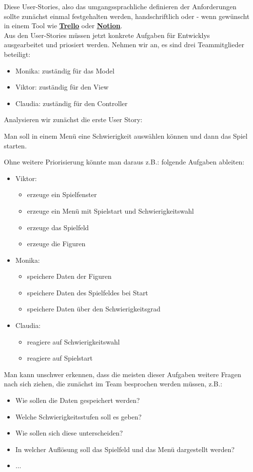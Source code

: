 \documentclass{article}
\begin{document}
Diese User-Stories, also das umgangssprachliche definieren der Anforderungen sollte zunächst einmal festgehalten werden, handschriftlich oder - wenn gewünscht in einem Tool wie \textbf{\href{https://trello.com/}{Trello}} oder \textbf{\href{https://www.notion.so/de-de}{Notion}}. \\
Aus den User-Stories müssen jetzt konkrete Aufgaben für Entwicklys ausgearbeitet und priosiert werden. Nehmen wir an, es sind drei Teammitglieder beteiligt:
\begin{itemize}
    \item Monika: zuständig für das Model
    \item Viktor: zuständig für den View
    \item Claudia: zuständig für den Controller 
\end{itemize}

Analysieren wir zunächst die erste User Story:
\begin{center}
    Man soll in einem Menü eine Schwierigkeit auswählen können und dann das Spiel starten.
\end{center}
Ohne weitere Priorisierung könnte man daraus z.B.: folgende Aufgaben ableiten:
\begin{itemize}
    \item Viktor: \begin{itemize}
        \item erzeuge ein Spielfenster
        \item erzeuge ein Menü mit Spielstart und Schwierigkeitswahl
        \item erzeuge das Spielfeld
        \item erzeuge die Figuren
    \end{itemize}
    \item Monika: \begin{itemize}
        \item speichere Daten der Figuren
        \item speichere Daten des Spielfeldes bei Start 
        \item speichere Daten über den Schwierigkeitsgrad
    \end{itemize}
    \item Claudia: \begin{itemize}
        \item reagiere auf Schwierigkeitswahl 
        \item reagiere auf Spielstart
    \end{itemize}
\end{itemize}
Man kann unschwer erkennen, dass die meisten dieser Aufgaben weitere Fragen nach sich ziehen, die zunächst im Team besprochen werden müssen, z.B.:
\begin{itemize}
    \item Wie sollen die Daten gespeichert werden?
    \item Welche Schwierigkeitsstufen soll es geben?
    \item Wie sollen sich diese unterscheiden?
    \item In welcher Auflösung soll das Spielfeld und das Menü dargestellt werden?
    \item $\dots$
\end{itemize}
\end{document}
